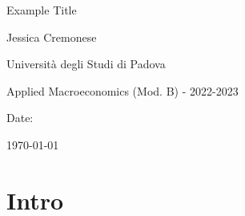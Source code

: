\documentclass[10pt,a4paper,draft]{article}
\begin{document}
\begin{titlepage}
    \centering
    \vspace*{2cm}
    {\LARGE Example Title \par}
    \vspace{2cm}
    {\large Jessica Cremonese \par}
    \vspace{1cm}
    {\large Università degli Studi di Padova \par}
    \vspace{1cm}
    {\large Applied Macroeconomics (Mod. B) - 2022-2023 \par}
    \vspace{1cm}
    {\large Date: \par}
    {\large \today \par}
\end{titlepage}


\newpage
\section{Intro}

\end{document}
